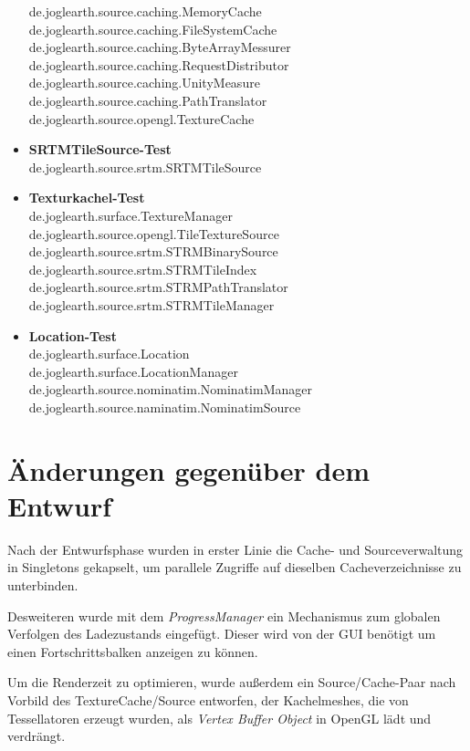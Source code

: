 \documentclass[10pt]{scrreprt}
\begin{document}
\begin{itemize}
 de.joglearth.source.caching.MemoryCache\\
 de.joglearth.source.caching.FileSystemCache\\
 de.joglearth.source.caching.ByteArrayMessurer\\
 de.joglearth.source.caching.RequestDistributor\\
 de.joglearth.source.caching.UnityMeasure\\
 de.joglearth.source.caching.PathTranslator
 de.joglearth.source.opengl.TextureCache\\
 \item \textbf{SRTMTileSource-Test}\\
 de.joglearth.source.srtm.SRTMTileSource
 \item \textbf{Texturkachel-Test}\\
 de.joglearth.surface.TextureManager\\
 de.joglearth.source.opengl.TileTextureSource\\
 de.joglearth.source.srtm.STRMBinarySource\\
 de.joglearth.source.srtm.STRMTileIndex\\
 de.joglearth.source.srtm.STRMPathTranslator\\
 de.joglearth.source.srtm.STRMTileManager
 \item \textbf{Location-Test}\\
 de.joglearth.surface.Location\\
 de.joglearth.surface.LocationManager\\
 de.joglearth.source.nominatim.NominatimManager\\
 de.joglearth.source.naminatim.NominatimSource
\end{itemize}



\chapter{Änderungen gegenüber dem Entwurf}

Nach der Entwurfsphase wurden in erster Linie die Cache- und Sourceverwaltung in Singletons gekapselt, um parallele Zugriffe auf dieselben Cacheverzeichnisse zu unterbinden.

Desweiteren wurde mit dem \textit{ProgressManager} ein Mechanismus zum globalen Verfolgen des Ladezustands eingefügt. Dieser wird von der GUI benötigt um einen Fortschrittsbalken anzeigen zu können.

Um die Renderzeit zu optimieren, wurde außerdem ein Source/Cache-Paar nach Vorbild des TextureCache/Source entworfen, der Kachelmeshes, die von Tessellatoren erzeugt wurden, als \textit{Vertex Buffer Object} in OpenGL lädt und verdrängt.
\end{document}
